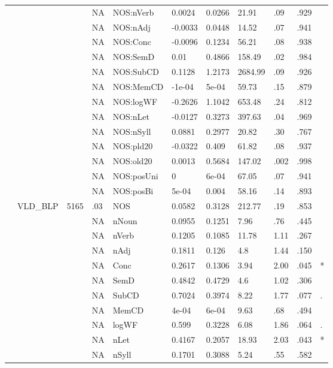 \begin{table}[ht]
\begin{tabular}{lllllllllll}
   &  &  & NA & NOS:nVerb & 0.0024 & 0.0266 & 21.91 & .09 & .929 &   \\ 
   &  &  & NA & NOS:nAdj & -0.0033 & 0.0448 & 14.52 & .07 & .941 &   \\ 
   &  &  & NA & NOS:Conc & -0.0096 & 0.1234 & 56.21 & .08 & .938 &   \\ 
   &  &  & NA & NOS:SemD & 0.01 & 0.4866 & 158.49 & .02 & .984 &   \\ 
   &  &  & NA & NOS:SubCD & 0.1128 & 1.2173 & 2684.99 & .09 & .926 &   \\ 
   &  &  & NA & NOS:MemCD & -1e-04 & 5e-04 & 59.73 & .15 & .879 &   \\ 
   &  &  & NA & NOS:logWF & -0.2626 & 1.1042 & 653.48 & .24 & .812 &   \\ 
   &  &  & NA & NOS:nLet & -0.0127 & 0.3273 & 397.63 & .04 & .969 &   \\ 
   &  &  & NA & NOS:nSyll & 0.0881 & 0.2977 & 20.82 & .30 & .767 &   \\ 
   &  &  & NA & NOS:pld20 & -0.0322 & 0.409 & 61.82 & .08 & .937 &   \\ 
   &  &  & NA & NOS:old20 & 0.0013 & 0.5684 & 147.02 & .002 & .998 &   \\ 
   &  &  & NA & NOS:posUni & 0 & 6e-04 & 67.05 & .07 & .941 &   \\ 
   &  &  & NA & NOS:posBi & 5e-04 & 0.004 & 58.16 & .14 & .893 &   \\ 
   & VLD\_BLP & 5165 & .03 & NOS & 0.0582 & 0.3128 & 212.77 & .19 & .853 &   \\ 
   &  &  & NA & nNoun & 0.0955 & 0.1251 & 7.96 & .76 & .445 &   \\ 
   &  &  & NA & nVerb & 0.1205 & 0.1085 & 11.78 & 1.11 & .267 &   \\ 
   &  &  & NA & nAdj & 0.1811 & 0.126 & 4.8 & 1.44 & .150 &   \\ 
   &  &  & NA & Conc & 0.2617 & 0.1306 & 3.94 & 2.00 & .045 & * \\ 
   &  &  & NA & SemD & 0.4842 & 0.4729 & 4.6 & 1.02 & .306 &   \\ 
   &  &  & NA & SubCD & 0.7024 & 0.3974 & 8.22 & 1.77 & .077 & . \\ 
   &  &  & NA & MemCD & 4e-04 & 6e-04 & 9.63 & .68 & .494 &   \\ 
   &  &  & NA & logWF & 0.599 & 0.3228 & 6.08 & 1.86 & .064 & . \\ 
   &  &  & NA & nLet & 0.4167 & 0.2057 & 18.93 & 2.03 & .043 & * \\ 
   &  &  & NA & nSyll & 0.1701 & 0.3088 & 5.24 & .55 & .582 &   \\ 

\end{tabular}
\end{table}
